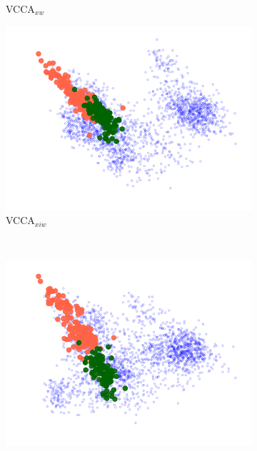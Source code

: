 \begin{figure}[t]
\begin{subfigure}[b]{0.3\textwidth}
         \caption{VCCA$_{x w}$}
         \label{fig:pca_vcca_xw_apples}
     \end{subfigure} 
     \begin{subfigure}[b]{0.3\textwidth}
         \centering
         \includegraphics[width=\textwidth]{PaperB/figures_and_tables/latent_space_visualizations/apples_new/pca_latent_apples_vcca_xiw_seed2.png}
         \caption{VCCA$_{x i w}$}
         \label{fig:pca_vcca_xiw_apples}
     \end{subfigure} \\
     \begin{subfigure}[b]{0.3\textwidth}
         \centering
         \includegraphics[width=\textwidth]{PaperB/figures_and_tables/latent_space_visualizations/apples_new/pca_latent_apples_vcca_xiy_seed2.png}

\end{subfigure}
\end{figure}
